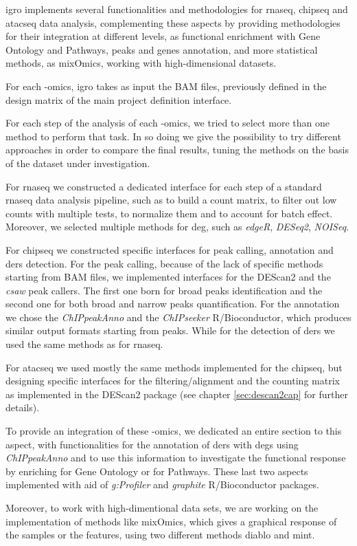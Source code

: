 \gls{igro} implements several functionalities and methodologies for \gls{rnaseq}, \gls{chipseq} and \gls{atacseq} data analysis, complementing these aspects by providing methodologies for their integration at different levels, as functional enrichment with Gene Ontology and Pathways,  peaks and genes annotation, and more statistical methods, as mixOmics, working with high-dimensional datasets.

For each -omics, \gls{igro} takes as input the BAM files, previously defined in the design matrix of the main project definition interface.

For each step of the analysis of each -omics, we tried to select more than one method to perform that task. 
In so doing we give the possibility to try different approaches in order to compare the final results, tuning the methods on the basis of the dataset under investigation.

For \gls{rnaseq} we constructed a dedicated interface for each step of a standard \gls{rnaseq} data analysis pipeline, such as to build a count matrix, to filter out low counts with multiple tests, to normalize them and to account for batch effect. 
Moreover, we selected multiple methods for \gls{deg}, such as \textit{edgeR}, \textit{DESeq2}, \textit{NOISeq}.

For \gls{chipseq} we constructed specific interfaces for peak calling, annotation and \glspl{der} detection.
For the peak calling, because of the lack of specific methods starting from BAM files, we implemented interfaces for the DEScan2 and the \textit{csaw}\cite{Lun2015} peak callers. The first one born for broad peaks identification and the second one for both broad and narrow peaks quantification.
For the annotation we chose the \textit{ChIPpeakAnno} and the \textit{ChIPseeker} R/Bioconductor, which produces similar output formats starting from peaks. While for the detection of \glspl{der} we used the same methods as for \gls{rnaseq}.

For \gls{atacseq} we used mostly the same methods implemented for the \gls{chipseq}, but designing specific interfaces for the filtering/alignment and the counting matrix as implemented in the DEScan2 package (see chapter \ref{sec:descan2cap} for further details).

To provide an integration of these -omics, we dedicated an entire section to this aspect, with functionalities for the annotation of \glspl{der} with \glspl{deg} using \textit{ChIPpeakAnno} and to use this information to investigate the functional response by enriching for Gene Ontology or for Pathways.
These last two aspects implemented with aid of \textit{g:Profiler} \cite{Reimand2016} and \textit{graphite} \cite{Sales2012a} R/Bioconductor packages.

Moreover, to work with high-dimentional data sets, we are working on the implementation of methods like mixOmics, which gives a graphical response of the samples or the features, using two different methods diablo and mint.
